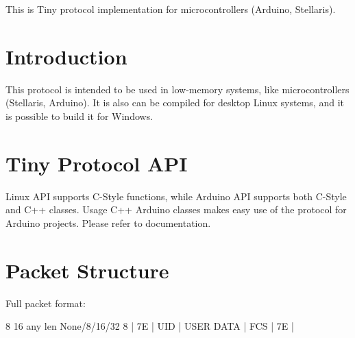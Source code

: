 This is Tiny protocol implementation for microcontrollers (Arduino, Stellaris).\hypertarget{index_introduction}{}\section{Introduction}\label{index_introduction}
This protocol is intended to be used in low-\/memory systems, like microcontrollers (Stellaris, Arduino). It is also can be compiled for desktop Linux systems, and it is possible to build it for Windows.\hypertarget{index_api}{}\section{Tiny Protocol A\+PI}\label{index_api}
Linux A\+PI supports C-\/\+Style functions, while Arduino A\+PI supports both C-\/\+Style and C++ classes. Usage C++ Arduino classes makes easy use of the protocol for Arduino projects. Please refer to documentation.\hypertarget{index_packet}{}\section{Packet Structure}\label{index_packet}
Full packet format\+: 
\begin{DoxyPre}
     8       16       any len    None/8/16/32     8
 |   7E   |  UID  |  USER DATA  |    FCS     |   7E   |
\end{DoxyPre}



